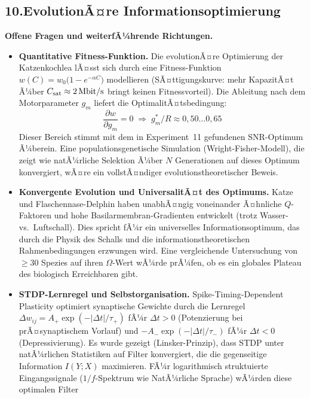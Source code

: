 ﻿\documentclass[12pt,a4paper,titlepage]{report}
\begin{document}
\subsection*{10.\enspace EvolutionÃ¤re Informationsoptimierung}

\textbf{Offene Fragen und weiterfÃ¼hrende Richtungen.}
\begin{itemize}[leftmargin=2em]
  \item \textbf{Quantitative Fitness-Funktion.}
    Die evolutionÃ¤re Optimierung der Katzenkochlea lÃ¤sst sich
    durch eine Fitness-Funktion
    $w(C) = w_0\bigl(1 - e^{-\alpha C}\bigr)$
    modellieren (SÃ¤ttigungskurve: mehr KapazitÃ¤t Ã¼ber
    $C_{\rm sat}\approx2\,\mathrm{Mbit/s}$ bringt keinen Fitnessvorteil).
    Die Ableitung nach dem Motorparameter $g_m$ liefert die
    OptimalitÃ¤tsbedingung:
    \[
      \frac{\partial w}{\partial g_m} = 0
      \;\Longrightarrow\;
      g_m^* / R \approx 0{,}50\ldots0{,}65
    \]
    Dieser Bereich stimmt mit dem in Experiment~11 gefundenen
    SNR-Optimum Ã¼berein.
    Eine popula\-tionsgenetische Simulation (Wright-Fisher-Modell),
    die zeigt wie natÃ¼rliche Selektion Ã¼ber $N$ Generationen
    auf dieses Optimum konvergiert, wÃ¤re ein
    vollstÃ¤ndiger evolutionstheoretischer Beweis.
  \item \textbf{Konvergente Evolution und UniversalitÃ¤t des Optimums.}
    Katze und Flaschen\-nase-Delphin haben unabhÃ¤ngig voneinander
    Ã¤hnliche $Q$-Faktoren und hohe Basilar\-membran-Gradienten entwickelt
    (trotz Wasser- vs.\ Luftschall).
    Dies spricht fÃ¼r ein universelles Informationsoptimum,
    das durch die Physik des Schalls und die informationstheoretischen
    Rahmenbedingungen erzwungen wird.
    Eine vergleichende Untersuchung von $\geq 30$ Spezies
    auf ihren $\Omega$-Wert wÃ¼rde prÃ¼fen, ob es
    ein globales Plateau des biologisch Erreichbaren gibt.
  \item \textbf{STDP-Lernregel und Selbstorganisation.}
    Spike-Timing-Dependent Plasticity optimiert synaptische Gewichte
    durch die Lernregel
    $\Delta w_{ij} = A_+\exp(-|\Delta t|/\tau_+)$ fÃ¼r $\Delta t > 0$
    (Potenzierung bei prÃ¤synaptischem Vorlauf) und
    $-A_-\exp(-|\Delta t|/\tau_-)$ fÃ¼r $\Delta t < 0$ (Depressivierung).
    Es wurde gezeigt (Linsker-Prinzip), dass STDP unter natÃ¼rlichen Statistiken
    auf Filter konvergiert, die die gegenseitige Information $I(Y;X)$
    maximieren.
    FÃ¼r logarithmisch struktuierte Eingangssignale ($1/f$-Spektrum
    wie NatÃ¼rliche Sprache) wÃ¼rden diese optimalen Filter

\end{itemize}
\end{document}
